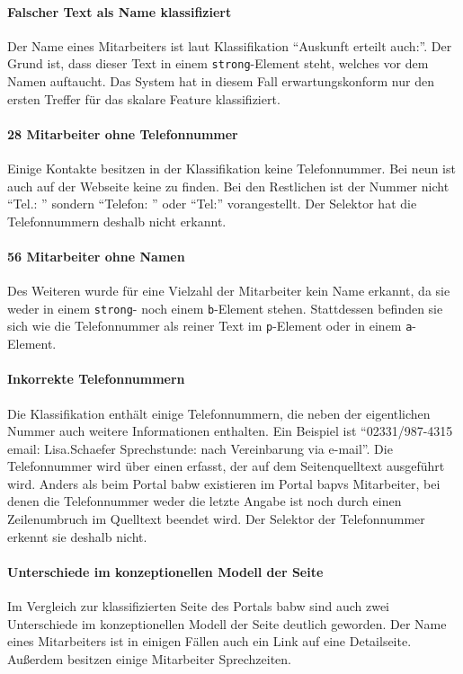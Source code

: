     \paragraph{Falscher Text als Name klassifiziert}
    Der Name eines Mitarbeiters ist laut Klassifikation
    "`Auskunft erteilt auch:"'.
    Der Grund ist, dass dieser Text in einem \texttt{strong}-Element steht,
    welches vor dem Namen auftaucht.
    Das System hat in diesem Fall erwartungskonform nur den ersten
    Treffer für das skalare Feature klassifiziert.
        
    \paragraph{28 Mitarbeiter ohne Telefonnummer}
    Einige Kontakte besitzen in der Klassifikation keine Telefonnummer.
    Bei neun ist auch auf der Webseite keine zu finden.
    Bei den Restlichen ist der Nummer nicht "`Tel.: "'
    sondern "`Telefon: "' oder "`Tel:"' vorangestellt.
    Der Selektor hat die Telefonnummern deshalb nicht erkannt.
    
    \paragraph{56 Mitarbeiter ohne Namen}
    Des Weiteren wurde für eine Vielzahl der Mitarbeiter kein Name erkannt,
    da sie weder in einem \texttt{strong}- noch einem \texttt{b}-Element stehen.
    Stattdessen befinden sie sich wie die Telefonnummer als reiner Text im \texttt{p}-Element
    oder in einem \texttt{a}-Element.

    \paragraph{Inkorrekte Telefonnummern}
    Die Klassifikation enthält einige Telefonnummern,
    die neben der eigentlichen Nummer auch weitere Informationen enthalten.
    Ein Beispiel ist "`02331/987-4315 email: Lisa.Schaefer Sprechstunde: nach Vereinbarung via e-mail"'.
    Die Telefonnummer wird über einen {\xpathSelector} erfasst,
    der auf dem Seitenquelltext ausgeführt wird.
    Anders als beim Portal \gls{babw} existieren im Portal \gls{bapvs} Mitarbeiter,
    bei denen die Telefonnummer weder die letzte Angabe ist
    noch durch einen Zeilenumbruch im Quelltext beendet wird.
    Der Selektor der Telefonnummer erkennt sie deshalb
    nicht.

    \paragraph{Unterschiede im konzeptionellen Modell der Seite}
    Im Vergleich zur klassifizierten Seite des Portals \gls{babw}
    sind auch zwei Unterschiede im konzeptionellen Modell der Seite deutlich geworden.
    Der Name eines Mitarbeiters ist in einigen Fällen
    auch ein Link auf eine Detailseite.
    Außerdem besitzen einige Mitarbeiter Sprechzeiten.

